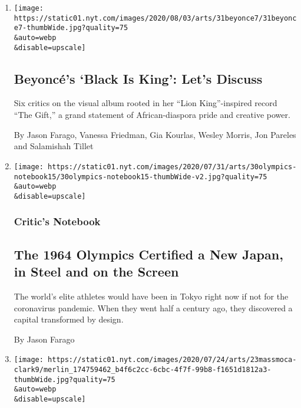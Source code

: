 \begin{enumerate}
\def\labelenumi{\arabic{enumi}.}
\item
  \href{/2020/07/31/arts/music/beyonce-black-is-king.html}{}

  \texttt{[image: https://static01.nyt.com/images/2020/08/03/arts/31beyonce7/31beyonce7-thumbWide.jpg?quality=75\\\&auto=webp\\\&disable=upscale]}

  \hypertarget{beyoncuxe9s-black-is-king-lets-discuss}{%
  \subsection{Beyoncé's `Black Is King': Let's
  Discuss}\label{beyoncuxe9s-black-is-king-lets-discuss}}

  Six critics on the visual album rooted in her ``Lion King''-inspired
  record ``The Gift,'' a grand statement of African-diaspora pride and
  creative power.

  By Jason Farago, Vanessa Friedman, Gia Kourlas, Wesley Morris, Jon
  Pareles and Salamishah Tillet
\item
  \href{/2020/07/30/arts/design/tokyo-olympics-1964-design.html}{}

  \texttt{[image: https://static01.nyt.com/images/2020/07/31/arts/30olympics-notebook15/30olympics-notebook15-thumbWide-v2.jpg?quality=75\\\&auto=webp\\\&disable=upscale]}

  \hypertarget{critics-notebook}{%
  \subsubsection{Critic's Notebook}\label{critics-notebook}}

  \hypertarget{the-1964-olympics-certified-a-new-japan-in-steel-and-on-the-screen}{%
  \subsection{The 1964 Olympics Certified a New Japan, in Steel and on
  the
  Screen}\label{the-1964-olympics-certified-a-new-japan-in-steel-and-on-the-screen}}

  The world's elite athletes would have been in Tokyo right now if not
  for the coronavirus pandemic. When they went half a century ago, they
  discovered a capital transformed by design.

  By Jason Farago
\item
  \href{/2020/07/23/arts/design/massmoca-clark-art-museum.html}{}

  \texttt{[image: https://static01.nyt.com/images/2020/07/24/arts/23massmoca-clark9/merlin\_174759462\_b4f6c2cc-6cbc-4f7f-99b8-f1651d1812a3-thumbWide.jpg?quality=75\\\&auto=webp\\\&disable=upscale]}


\end{enumerate}
